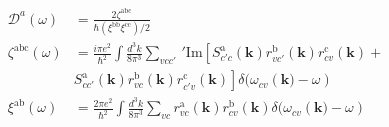 \documentclass{article}
\begin{document}
\begin{align*}
\mathcal{D}^{a} (\omega) &= 
\frac{2 \zeta^{\mathrm{abc}}}
{\hbar \left( \xi^{\mathrm{bb}} \xi^{\mathrm{cc}} \right)/2}
\\
\zeta^{\mathrm{abc}} (\omega) &=
\frac{i \pi e^{2}}{\hbar^{2}}
\int \frac{d^{3} k}{8 \pi^{3}}
\sum_{vcc'} \,' \mathrm{Im} 
\left[ 
S^{\mathrm{a}}_{c'c}(\mathbf{k})
r^{\mathrm{b}}_{vc'}(\mathbf{k}) r^{\mathrm{c}}_{cv}(\mathbf{k}) + 
\right.
\\ &
\left.
S^{\mathrm{a}}_{cc'}(\mathbf{k})
r^{\mathrm{b}}_{vc}(\mathbf{k}) r^{\mathrm{c}}_{c'v}(\mathbf{k})
\right]
\delta(\omega_{cv} \left(\mathbf{k}) - \omega \right)
\\
\xi^{\mathrm{ab}} (\omega) &= 
\frac{2 \pi e^{2}}{\hbar^{2}}
\int \frac{d^{3} k}{8 \pi^{3}}
\sum_{vc} r^{\mathrm{a}}_{vc}(\mathbf{k}) r^{\mathrm{b}}_{cv}(\mathbf{k})
\delta(\omega_{cv} \left(\mathbf{k}) - \omega \right)
\end{align*}
\end{document}
